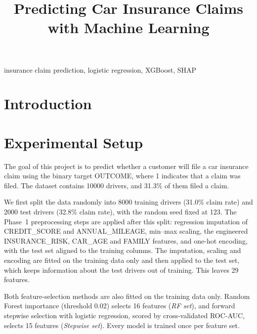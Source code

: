 \documentclass[conference]{IEEEtran}
\begin{document}
\title{Predicting Car Insurance Claims with Machine Learning}

\author{
}

\maketitle

\begin{abstract}
\end{abstract}

\begin{IEEEkeywords}
insurance claim prediction, logistic regression, XGBoost, SHAP
\end{IEEEkeywords}

\section{Introduction}

\section{Experimental Setup}

The goal of this project is to predict whether a customer will file a car insurance claim using the binary
target OUTCOME, where 1 indicates that a claim was filed. The dataset contains \num{10000} drivers, and
31.3\% of them filed a claim.

We first split the data randomly into \num{8000} training drivers (31.0\% claim rate) and \num{2000} test
drivers (32.8\% claim rate), with the random seed fixed at 123. The Phase~1 preprocessing steps are applied
after this split: regression imputation of CREDIT\_SCORE and ANNUAL\_MILEAGE, min--max scaling, the
engineered INSURANCE\_RISK, CAR\_AGE and FAMILY features, and one-hot encoding, with the test set aligned to
the training columns. The imputation, scaling and encoding are fitted on the training data only and then
applied to the test set, which keeps information about the test drivers out of training. This leaves 29
features.

Both feature-selection methods are also fitted on the training data only. Random Forest importance
(threshold 0.02) selects 16 features (\emph{RF set}), and forward stepwise selection with logistic
regression, scored by cross-validated ROC-AUC, selects 15 features (\emph{Stepwise set}). Every model is
trained once per feature set.
\end{document}
